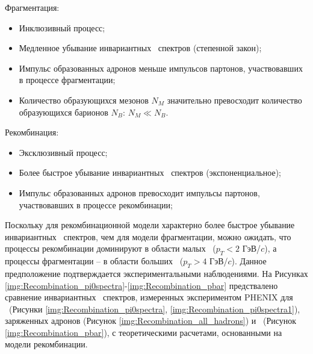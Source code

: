 Фрагментация:
\begin{itemize}[]
	\item Инклюзивный процесс;
	\item Медленное убывание инвариантных \pt \ спектров (степенной закон);
	\item Импульс образованных адронов меньше импульсов партонов, участвовавших в процессе фрагментации;
	\item Количество образующихся мезонов $N_M$ значительно превосходит количество образующихся барионов $N_B$: $N_M \ll N_B$.
\end{itemize}

Рекомбинация:
\begin{itemize}[]
	\item Эксклюзивный процесс;
	\item Более быстрое убывание инвариантных \pt \ спектров (экспоненциальное);
	\item Импульс образованных адронов превосходит импульсы партонов, участвовавших в процессе рекомбинации;
	
\end{itemize}

\begin{comment}
	Процесс фрагментации является инклюзивным, поскольку любой жесткий партон ($p_T > 5$) может фрагментировать с образованием новых адронов, тогда как для рекомбинации необходимо, чтобы они находились в на расстоянии в фазовом пространстве меньшем, чем радиус рекомбинации. 
	Инвариантный \pt \ спектр адронов, предсказываемый моделью фрагментации, имеет более медленный спад по сравнению с тем, что предсказывает модель рекомбинаци. Фрагментация значительно благоприятствует образованию мезонов, поскольку при фрагментации с гораздо большей вероятностью образуется кварк-антикварковая пара, чем дикварк [4]. 4]; при рекомбинации они образуются примерно в равной степени.
\end{comment}
Поскольку для рекомбинационной модели характерно более быстрое убывание инвариантных \pt \ спектров, чем  для модели фрагментации, можно ожидать, что процессы рекомбинации доминируют в области малых \pt \ ($p_T<2$ ГэВ/$c$), а процессы фрагментации -- в области больших \pt \ ($p_T>4$ ГэВ/$c$). Данное предположение подтверждается экспериментальными наблюдениями. На Рисунках \ref{img:Recombination_pi0spectra}-\ref{img:Recombination_pbar} предствалено сравнение инвариантных \pt \ спектров, измеренных экспериментом PHENIX для \pio \ (Рисунки \ref{img:Recombination_pi0spectra}, \ref{img:Recombination_pi0spectra1}), заряженных адронов (Рисунок \ref{img:Recombination_all_hadrons}) и \aprot \ (Рисунок \ref{img:Recombination_pbar}), с теоретическими расчетами, основанными на модели рекомбинации. 


